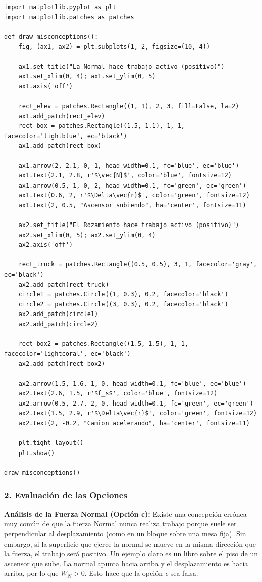 \documentclass[12pt, a4paper]{article}
\begin{document}
\begin{lstlisting}
import matplotlib.pyplot as plt
import matplotlib.patches as patches

def draw_misconceptions():
    fig, (ax1, ax2) = plt.subplots(1, 2, figsize=(10, 4))
    
    ax1.set_title("La Normal hace trabajo activo (positivo)")
    ax1.set_xlim(0, 4); ax1.set_ylim(0, 5)
    ax1.axis('off')
    
    rect_elev = patches.Rectangle((1, 1), 2, 3, fill=False, lw=2)
    ax1.add_patch(rect_elev)
    rect_box = patches.Rectangle((1.5, 1.1), 1, 1, facecolor='lightblue', ec='black')
    ax1.add_patch(rect_box)
    
    ax1.arrow(2, 2.1, 0, 1, head_width=0.1, fc='blue', ec='blue')
    ax1.text(2.1, 2.8, r'$\vec{N}$', color='blue', fontsize=12)
    ax1.arrow(0.5, 1, 0, 2, head_width=0.1, fc='green', ec='green')
    ax1.text(0.6, 2, r'$\Delta\vec{r}$', color='green', fontsize=12)
    ax1.text(2, 0.5, "Ascensor subiendo", ha='center', fontsize=11)

    ax2.set_title("El Rozamiento hace trabajo activo (positivo)")
    ax2.set_xlim(0, 5); ax2.set_ylim(0, 4)
    ax2.axis('off')
    
    rect_truck = patches.Rectangle((0.5, 0.5), 3, 1, facecolor='gray', ec='black')
    ax2.add_patch(rect_truck)
    circle1 = patches.Circle((1, 0.3), 0.2, facecolor='black')
    circle2 = patches.Circle((3, 0.3), 0.2, facecolor='black')
    ax2.add_patch(circle1)
    ax2.add_patch(circle2)
    
    rect_box2 = patches.Rectangle((1.5, 1.5), 1, 1, facecolor='lightcoral', ec='black')
    ax2.add_patch(rect_box2)
    
    ax2.arrow(1.5, 1.6, 1, 0, head_width=0.1, fc='blue', ec='blue')
    ax2.text(2.6, 1.5, r'$f_s$', color='blue', fontsize=12)
    ax2.arrow(0.5, 2.7, 2, 0, head_width=0.1, fc='green', ec='green')
    ax2.text(1.5, 2.9, r'$\Delta\vec{r}$', color='green', fontsize=12)
    ax2.text(2, -0.2, "Camion acelerando", ha='center', fontsize=11)

    plt.tight_layout()
    plt.show()

draw_misconceptions()
\end{lstlisting}

\subsubsection*{2. Evaluación de las Opciones}

\textbf{Análisis de la Fuerza Normal (Opción c):}
Existe una concepción errónea muy común de que la fuerza Normal nunca realiza trabajo porque suele ser perpendicular al desplazamiento (como en un bloque sobre una mesa fija). Sin embargo, si la superficie que ejerce la normal se mueve en la misma dirección que la fuerza, el trabajo será positivo. Un ejemplo claro es un libro sobre el piso de un ascensor que sube. La normal apunta hacia arriba y el desplazamiento es hacia arriba, por lo que $W_N > 0$. Esto hace que la opción \textit{c} sea falsa.
\end{document}
